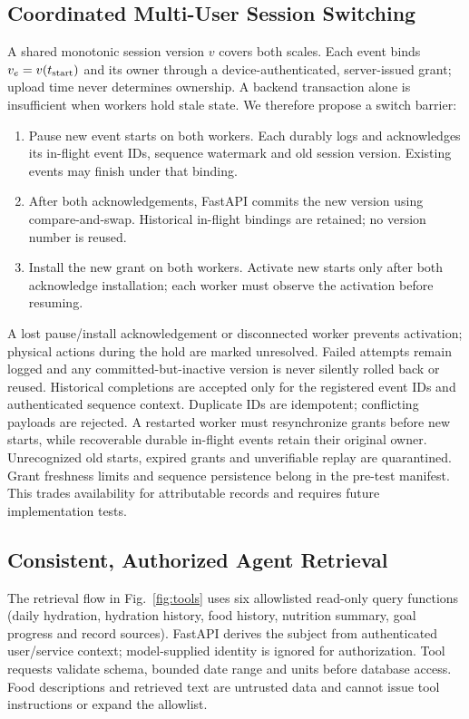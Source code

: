 \subsection{Coordinated Multi-User Session Switching}
A shared monotonic session version $v$ covers both scales. Each event binds $v_e=v(t_{\rm start})$ and its owner through a device-authenticated, server-issued grant; upload time never determines ownership. A backend transaction alone is insufficient when workers hold stale state. We therefore propose a switch barrier:
\begin{enumerate}
\item Pause new event starts on both workers. Each durably logs and acknowledges its in-flight event IDs, sequence watermark and old session version. Existing events may finish under that binding.
\item After both acknowledgements, FastAPI commits the new version using compare-and-swap. Historical in-flight bindings are retained; no version number is reused.
\item Install the new grant on both workers. Activate new starts only after both acknowledge installation; each worker must observe the activation before resuming.
\end{enumerate}
A lost pause/install acknowledgement or disconnected worker prevents activation; physical actions during the hold are marked unresolved. Failed attempts remain logged and any committed-but-inactive version is never silently rolled back or reused. Historical completions are accepted only for the registered event IDs and authenticated sequence context. Duplicate IDs are idempotent; conflicting payloads are rejected. A restarted worker must resynchronize grants before new starts, while recoverable durable in-flight events retain their original owner. Unrecognized old starts, expired grants and unverifiable replay are quarantined. Grant freshness limits and sequence persistence belong in the pre-test manifest. This trades availability for attributable records and requires future implementation tests.

\subsection{Consistent, Authorized Agent Retrieval}
The retrieval flow in Fig.~\ref{fig:tools} uses six allowlisted read-only query functions (daily hydration, hydration history, food history, nutrition summary, goal progress and record sources). FastAPI derives the subject from authenticated user/service context; model-supplied identity is ignored for authorization. Tool requests validate schema, bounded date range and units before database access. Food descriptions and retrieved text are untrusted data and cannot issue tool instructions or expand the allowlist.

